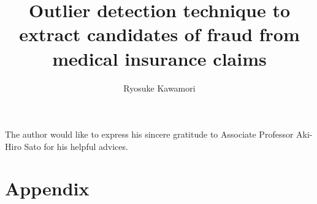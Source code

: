 \documentclass[dvipdfmx, english]{ampmt}             %
\title[Outlier detection technique to extract candidates of fraud from medical insurance claims]
      {Outlier detection technique to extract candidates of fraud from medical insurance claims}
\author{Ryosuke Kawamori}
\def\numberofspines{1}
\begin{document}
\ifoutputbody
\makeinsidecover                %
\makeabstract                   %
\maketoc                        %
\setcounter{page}{1}

















\acknowledgment
The author would like to express his sincere gratitude to Associate Professor
Aki-Hiro Sato for his helpful advices.


\appendix

\section{Appendix}


\fi
\ifoutputcover
\evenclearpage
\makecover                      %
\makespine[\numberofspines]     %
\fi
\ifoutputabstractforsubmission
\makeabstractforsubmission      %
\fi
\end{document}

